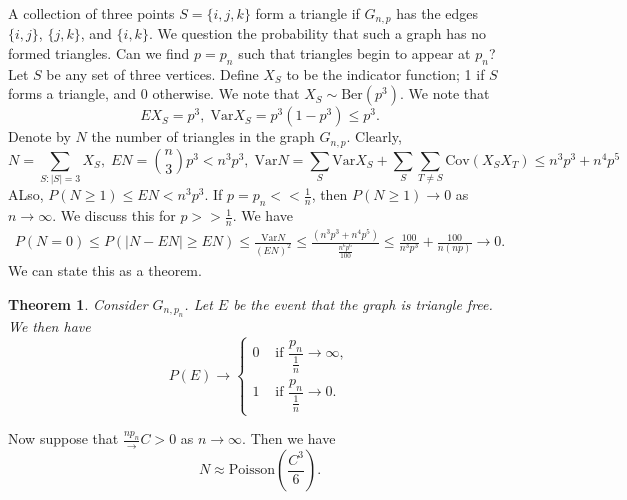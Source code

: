 \documentclass[15pt,a4paper]{book}
\newtheorem{theorem}{Theorem}[chapter]
\theoremstyle{definition}
\newcommand{\abs}[1]{\left| #1 \right|} %
\newcommand{\Var}{\text{Var}}
\newcommand{\Cov}{\text{Cov}}
\begin{document}
A collection of three points $S = \{i,j,k\}$ form a triangle if $G_{n,p}$ has the edges $\{i,j\}$, $\{j,k\}$, and $\{i,k\}$. We question the probability that such a graph has no formed triangles. Can we find $p = p_{n}$ such that triangles begin to appear at $p_{n}$? Let $S$ be any set of three vertices. Define $X_{S}$ to be the indicator function; 1 if $S$ forms a triangle, and 0 otherwise. We note that $X_{S} \sim \text{Ber}(p^{3})$. We note that
\begin{equation*}
    EX_{S} = p^{3}, \; \text{Var}X_{S} = p^{3}(1-p^{3}) \leq p^{3}.
\end{equation*}
Denote by $N$ the number of triangles in the graph $G_{n,p}$. Clearly,
\begin{equation*}
    N = \sum_{S: \abs{S} = 3} X_{S}, \;  EN = \binom{n}{3} p^{3} < n^{3}p^{3}, \; \text{Var}{N} = \sum_{S} \Var{X_{S}} + \sum_{S}\sum_{T \neq S} \Cov{(X_{S}X_{T})} \leq n^{3}p^{3} + n^{4}p^{5}
\end{equation*}
ALso, $P(N \geq 1) \leq EN < n^{3}p^{3}$. If $p = p_{n} << \frac{1}{n}$, then $P(N \geq 1) \to 0$ as $n \to \infty$. We discuss this for $p >> \frac{1}{n}$. We have
\begin{align}
    P(N = 0) \leq P(\abs{N-EN} \geq EN) \leq \frac{\text{Var}N}{(EN)^{2}} \leq \frac{(n^{3}p^{3}+n^{4}p^{5})}{\frac{n^{6}p^{6}}{100}} \leq \frac{100}{n^{3}p^{3}} + \frac{100}{n(np)} \to 0.
\end{align}
We can state this as a theorem.
\begin{theorem}
    Consider $G_{n,p_{n}}$. Let $E$ be the event that the graph is triangle free. We then have
    \begin{equation}
        P(E) \to \begin{cases}
        0 &\text{ if } \dfrac{p_{n}}{\frac{1}{n}} \to \infty,\\
        1 &\text{ if } \dfrac{p_{n}}{\frac{1}{n}} \to 0.
        \end{cases}
    \end{equation}
\end{theorem}
Now suppose that $\frac{np_{n}} \to C > 0$ as $n \to \infty$. Then we have
\begin{equation}
    N \approx \text{Poisson} \left( \frac{C^{3}}{6} \right).
\end{equation}
\end{document}
